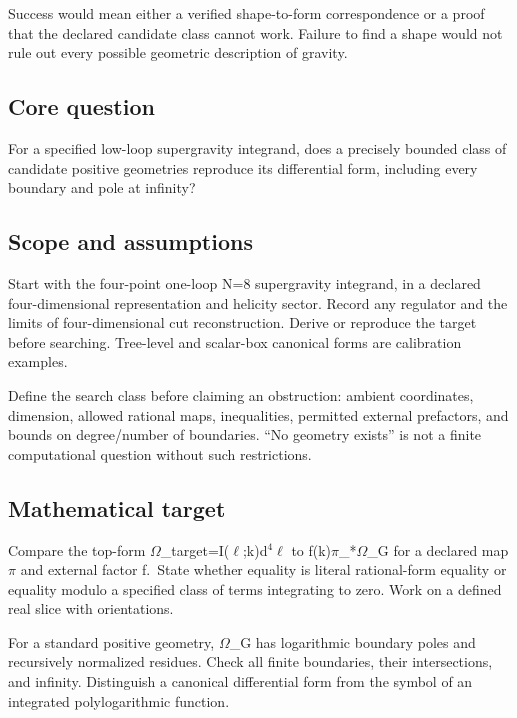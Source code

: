 \documentclass[
  11pt,
]{article}
\begin{document}
Success would mean either a verified shape-to-form correspondence or a
proof that the declared candidate class cannot work. Failure to find a
shape would not rule out every possible geometric description of
gravity.

\subsection{Core question}

For a specified low-loop supergravity integrand, does a precisely
bounded class of candidate positive geometries reproduce its
differential form, including every boundary and pole at infinity?

\subsection{Scope and assumptions}

Start with the four-point one-loop N=8 supergravity integrand, in a
declared four-dimensional representation and helicity sector. Record any
regulator and the limits of four-dimensional cut reconstruction. Derive
or reproduce the target before searching. Tree-level and scalar-box
canonical forms are calibration examples.

Define the search class before claiming an obstruction: ambient
coordinates, dimension, allowed rational maps, inequalities, permitted
external prefactors, and bounds on degree/number of boundaries. ``No
geometry exists'' is not a finite computational question without such
restrictions.

\subsection{Mathematical target}

Compare the top-form
\ensuremath{\Omega}\_target=I(\ensuremath{\ell};k)d\ensuremath{{}^{4}}\ensuremath{\ell}
to f(k)\ensuremath{\pi}\_*\ensuremath{\Omega}\_G for a declared map
\ensuremath{\pi} and external factor f.~State whether equality is
literal rational-form equality or equality modulo a specified class of
terms integrating to zero. Work on a defined real slice with
orientations.

For a standard positive geometry, \ensuremath{\Omega}\_G has logarithmic
boundary poles and recursively normalized residues. Check all finite
boundaries, their intersections, and infinity. Distinguish a canonical
differential form from the symbol of an integrated polylogarithmic
function.
\end{document}
